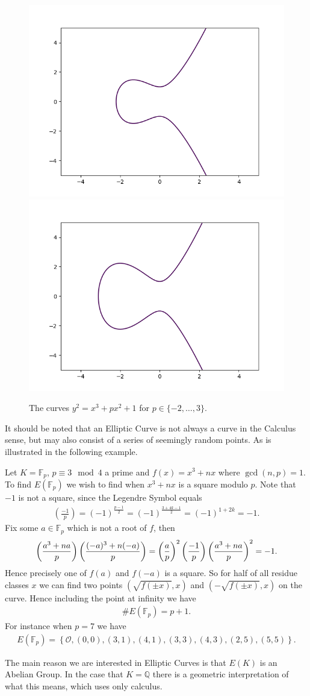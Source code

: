 \begin{example}
\begin{figure}[H]
    \includegraphics[width=0.3\linewidth]{ellipticCurves/example1p2.png}
    \includegraphics[width=0.3\linewidth]{ellipticCurves/example1p3.png}
    \caption{The curves $y^2 = x^3 + px^2 + 1$ for $p \in \{-2, \dots, 3\}$.}%
    \label{fig:curvesExamples}
  \end{figure}
\end{example}
It should be noted that an Elliptic Curve is not always a curve
in the Calculus sense, but may also consist of a series of seemingly
random points. As is illustrated in the following example.
\begin{example} \label{ex:curveExamplesFinite}
  Let $K = \mathbb{F}_{p}$, $p \equiv 3 \mod 4$ a prime and $f(x) = x^3 + nx$
  where $\gcd(n, p) = 1$.
  To find $E(\mathbb{F}_p)$ we wish to find when
  $x^3 + nx$ is a square modulo $p$.
  Note that $-1$ is not a square, since the Legendre Symbol equals
  \begin{align*}
    \left( \frac{-1}{p}  \right) = (-1)^{\frac{p-1}{2} } = (-1)^{\frac{3 + 4k - 1}{2} } = (-1)^{1 + 2 k} = -1.
  \end{align*}
  Fix some $a \in \mathbb{F}_p$ which is not a root of $f$,
  then
  \begin{align*}
    \left( \frac{a^3+na}{p} \right)\left( \frac{(-a)^3+n(-a)}{p} \right)
    = \left( \frac{a}{p} \right)^2 \left( \frac{-1}{p} \right)\left( \frac{a^3+na}{p} \right)^2
    = -1.
  \end{align*}
  Hence precisely one of $f(a)$ and $f(-a)$ is a square.
  So for half of all residue classes $x$ we can find two points $(\sqrt{f(\pm x)},x)$ and
  $(-\sqrt{f(\pm x)}, x)$ on the curve. Hence including the point at infinity
  we have
  \begin{align*}
    \# E(\mathbb{F}_p) = p + 1.
  \end{align*}
  For instance when $p = 7$ we have
  \begin{align*}
    E(\mathbb{F}_p) = \left\{ \mathcal{O}, (0, 0), (3, 1), (4, 1), (3, 3), (4, 3), (2, 5), (5, 5) \right\}.
  \end{align*}
\end{example}
The main reason we are interested in Elliptic Curves is that $E(K)$ is an Abelian Group.
In the case that $K = \mathbb{Q}$ there is a geometric interpretation of what
this means, which uses only calculus.

